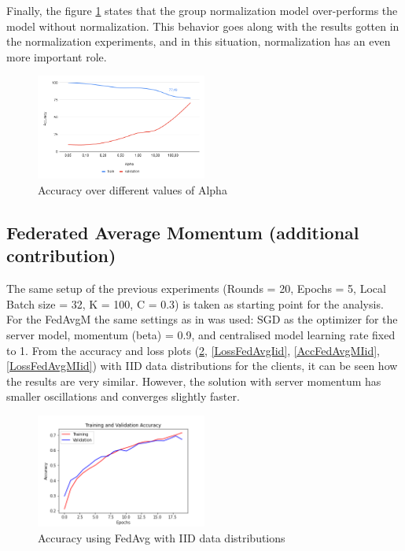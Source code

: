 \documentclass[twocolumn]{article}
\begin{document}
Finally, the figure \ref{AccAlpha} states that the group normalization model over-performs the model without normalization. This behavior goes along with the results gotten in the normalization experiments, and in this situation, normalization has an even more important role.


\begin{figure}
    \centering
    \includegraphics[width=0.5\textwidth,height=.3\textheight]{alphaAccuracy.png}
    \caption{Accuracy over different values of Alpha}
    \label{AccAlpha} 
\end{figure}


\subsection{Federated Average Momentum (additional contribution)}

The same setup of the previous experiments (Rounds = 20, Epochs = 5, Local Batch size = 32, K = 100, C = 0.3) is taken as starting point for the analysis.
For the FedAvgM the same settings as in \cite{DBLP:journals/corr/abs-1909-06335} was used: SGD as the optimizer for the server model,  momentum (beta) = 0.9, and centralised model learning rate fixed to 1.
From the accuracy and loss plots (\ref{AccFedAvgIid}, \ref{LossFedAvgIid}, \ref{AccFedAvgMIid}, \ref{LossFedAvgMIid}) with IID data distributions for the clients, it can be seen how the results are very similar. However, the solution with server momentum has smaller oscillations and converges slightly faster. 

\begin{figure}
    \centering
    \includegraphics[width=0.5\textwidth,height=.3\textheight]{4_AccuracyFedAvg_iid.png}
    \caption{Accuracy using FedAvg with IID data distributions}
     \label{AccFedAvgIid} 
\end{figure}
\end{document}
